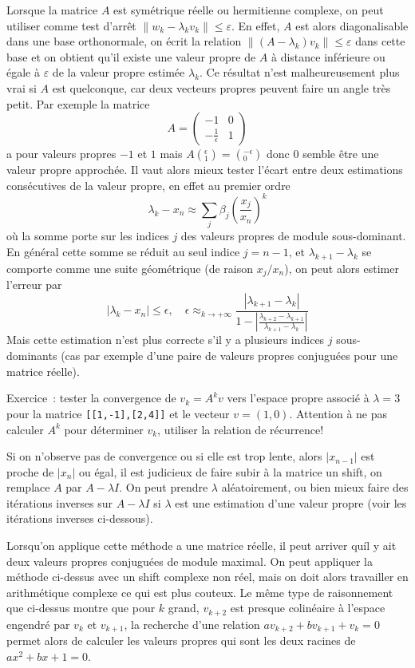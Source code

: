 \documentclass[a4paper,11pt]{book}
\begin{document}
\begin{giacjshere}
Lorsque la matrice $A$ est sym\'etrique r\'eelle ou hermitienne
complexe, on peut utiliser comme
test d'arr\^et $\| w_k-\lambda_k v_k\| \leq \varepsilon $. En effet,
$A$ est alors diagonalisable dans une base orthonormale,
on \'ecrit la relation $\| (A-\lambda_k)v_k \| \leq \varepsilon$
dans cette base et on obtient qu'il existe une valeur propre de $A$
\`a distance inf\'erieure ou \'egale \`a $\varepsilon$ de
la valeur propre estim\'ee $\lambda_k$. Ce r\'esultat n'est
malheureusement plus vrai si $A$ est quelconque, car deux
vecteurs propres peuvent faire un angle tr\`es petit. Par
exemple la matrice 
$$ A=\left(\begin{array}{cc} 
-1 & 0\\
-\frac1\epsilon& 1
\end{array}\right)$$
a pour valeurs propres $-1$ et $1$ mais
$A\left(^\epsilon_1\right)=\left(^{-\epsilon}_0\right)$ donc 0 semble
\^etre une valeur propre approch\'ee. Il vaut alors mieux tester
l'\'ecart entre deux estimations cons\'ecutives de la valeur
propre, en effet au premier ordre
$$ \lambda_k-x_n \approx \sum_j \beta_j \left( \frac{x_j}{x_n}\right)^k$$
o\`u la somme porte sur les indices $j$ des valeurs propres
de module sous-dominant. En g\'en\'eral cette somme se
r\'eduit au seul indice $j=n-1$, et $\lambda_{k+1}-\lambda_k$ se
comporte comme une suite g\'eom\'etrique (de raison $x_j/x_n$),
on peut alors estimer l'erreur par 
$$ |\lambda_k-x_n| \leq \epsilon, \quad
\epsilon \approx_{k \rightarrow +\infty} \frac{|\lambda_{k+1}-\lambda_k|}
{1-|\frac{\lambda_{k+2}-\lambda_{k+1}}{\lambda_{k+1}-\lambda_k}|}
$$
Mais cette estimation n'est plus correcte s'il y a plusieurs indices
$j$ sous-dominants (cas par exemple d'une paire 
de valeurs propres conjugu\'ees
pour une matrice r\'eelle).

Exercice~: tester la convergence de $v_k=A^kv$ vers l'espace propre
associé à $\lambda=3$ pour la matrice \verb|[[1,-1],[2,4]]|
et le vecteur $v=(1,0)$. Attention à ne pas calculer $A^k$ pour
déterminer $v_k$, utiliser la relation de récurrence!

Si on n'observe pas de convergence ou si elle est trop lente, alors
$|x_{n-1}|$ est proche de $|x_n|$ ou égal, il est judicieux
de faire subir à la matrice un shift, on remplace $A$ par
$A-\lambda I$. On peut prendre $\lambda$ aléatoirement, ou bien
mieux faire des itérations inverses sur $A-\lambda I$ si $\lambda$
est une estimation d'une valeur propre (voir les itérations inverses
ci-dessous).

Lorsqu'on applique cette méthode a une matrice réelle, il peut arriver
quíl y ait deux valeurs propres conjuguées de module maximal. On
peut appliquer la méthode ci-dessus avec un shift complexe non réel,
mais on doit alors travailler en arithmétique complexe 
ce qui est plus couteux. Le même
type de raisonnement que ci-dessus montre que pour $k$ grand,
$v_{k+2}$ est presque colinéaire à l'espace engendré par $v_k$ et $v_{k+1}$, 
la recherche d'une relation $ av_{k+2}+ b v_{k+1} + v_k=0$ 
permet alors de calculer les valeurs propres qui sont les deux racines
de $ax^2+bx+1=0$.


\end{giacjshere}
\end{document}
